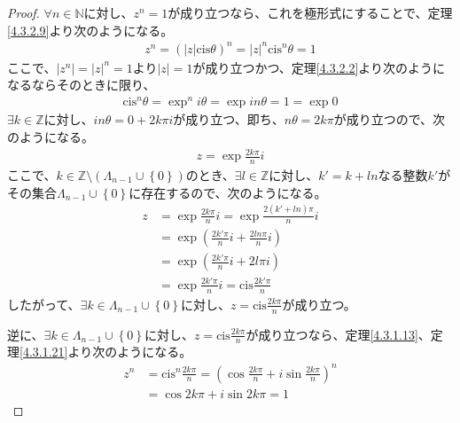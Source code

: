 \documentclass[dvipdfmx]{jsarticle}
\begin{document}
\begin{proof}
$\forall n \in \mathbb{N}$に対し、$z^{n} = 1$が成り立つなら、これを極形式にすることで、定理\ref{4.3.2.9}より次のようになる。
\begin{align*}
z^{n} = \left( |z|{\mathrm{cis}}\theta \right)^{n} = |z|^{n}{\mathrm{cis}}^{n}\theta = 1
\end{align*}
ここで、$\left| z^{n} \right| = |z|^{n} = 1$より$|z| = 1$が成り立つかつ、定理\ref{4.3.2.2}より次のようになるならそのときに限り、
\begin{align*}
{\mathrm{cis}}^{n}\theta = \exp^{n}{i\theta} = \exp{in\theta} = 1 = \exp 0
\end{align*}
$\exists k \in \mathbb{Z}$に対し、$in\theta = 0 + 2k\pi i$が成り立つ、即ち、$n\theta = 2k\pi$が成り立つので、次のようになる。
\begin{align*}
z = \exp{\frac{2k\pi}{n}i}
\end{align*}
ここで、$k \in \mathbb{Z} \setminus \left( \varLambda_{n - 1} \cup \left\{ 0 \right\} \right)$のとき、$\exists l \in \mathbb{Z}$に対し、$k' = k + ln$なる整数$k'$がその集合$\varLambda_{n - 1} \cup \left\{ 0 \right\}$に存在するので、次のようになる。
\begin{align*}
z &= \exp{\frac{2k\pi}{n}i} = \exp{\frac{2\left( k' + ln \right)\pi}{n}i}\\
&= \exp\left( \frac{2k'\pi}{n}i + \frac{2ln\pi}{n}i \right)\\
&= \exp\left( \frac{2k'\pi}{n}i + 2l\pi i \right)\\
&= \exp{\frac{2k'\pi}{n}i} = {\mathrm{cis}}\frac{2k'\pi}{n}
\end{align*}
したがって、$\exists k \in \varLambda_{n - 1} \cup \left\{ 0 \right\}$に対し、$z = {\mathrm{cis}}\frac{2k\pi}{n}$が成り立つ。\par
逆に、$\exists k \in \varLambda_{n - 1} \cup \left\{ 0 \right\}$に対し、$z = {\mathrm{cis}}\frac{2k\pi}{n}$が成り立つなら、定理\ref{4.3.1.13}、定理\ref{4.3.1.21}より次のようになる。
\begin{align*}
z^{n} &= {\mathrm{cis}}^{n}\frac{2k\pi}{n} = \left( \cos\frac{2k\pi}{n} + i\sin\frac{2k\pi}{n} \right)^{n}\\
&= \cos{2k\pi} + i\sin{2k\pi} = 1
\end{align*}
\end{proof}
\end{document}
